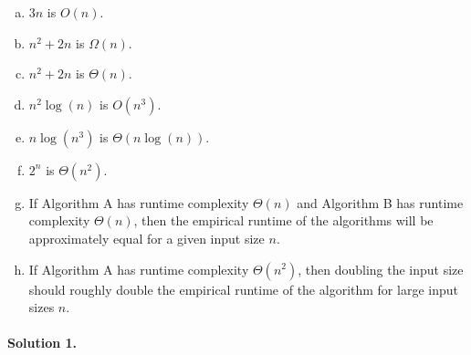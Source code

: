 \documentclass[11pt]{article}
\begin{document}
\begin{enumerate}[(a)]
    \item $3n$ is $O(n)$.
    
    \item $n^2 + 2n$  is $\Omega(n)$.

    \item $n^2 + 2n$  is $\Theta(n)$.
    
	\item $n^2 \log(n)$ is $O(n^3)$.
    
    \item $n\log(n^3)$ is $\Theta(n \log(n))$.

    \item $2^n$ is $\Theta(n^2)$.

    \item If Algorithm A has runtime complexity $\Theta(n)$ and Algorithm B has runtime complexity $\Theta(n)$, then the empirical runtime of the algorithms will be approximately equal for a given input size $n$.

    \item If Algorithm A has runtime complexity $\Theta(n^2)$, then doubling the input size should roughly double the empirical runtime of the algorithm for large input sizes $n$.
\end{enumerate}

\paragraph{Solution 1.}
\end{document}
